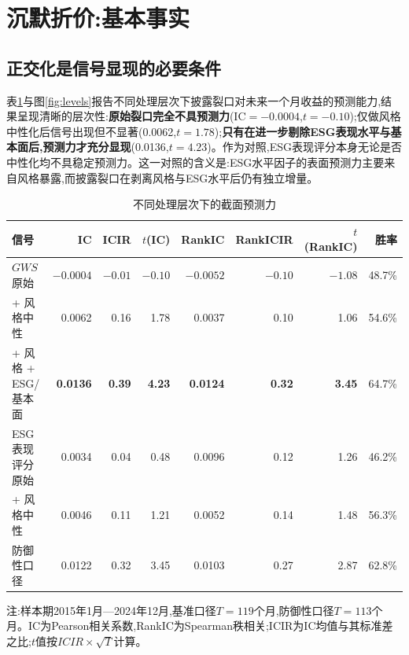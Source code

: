 \documentclass[UTF8, a4paper, fontset=fandol, zihao=-4]{ctexart}
\begin{document}
\section{沉默折价:基本事实}

\subsection{正交化是信号显现的必要条件}

表\ref{tab:ic}与图\ref{fig:levels}报告不同处理层次下披露裂口对未来一个月收益的预测能力,结果呈现清晰的层次性:\textbf{原始裂口完全不具预测力}(IC${}=-0.0004$,$t=-0.10$);仅做风格中性化后信号出现但不显著(0.0062,$t=1.78$);\textbf{只有在进一步剔除ESG表现水平与基本面后,预测力才充分显现}(0.0136,$t=4.23$)。作为对照,ESG表现评分本身无论是否中性化均不具稳定预测力。这一对照的含义是:ESG水平因子的表面预测力主要来自风格暴露,而披露裂口在剥离风格与ESG水平后仍有独立增量。

\begin{table}[H]
\centering
\begin{threeparttable}
\caption{不同处理层次下的截面预测力}\label{tab:ic}
\begin{tabular}{lrrrrrrr}
\toprule
信号 & IC & ICIR & $t$(IC) & RankIC & RankICIR & $t$(RankIC) & 胜率 \\
\midrule
$GWS$ 原始 & $-0.0004$ & $-0.01$ & $-0.10$ & $-0.0052$ & $-0.10$ & $-1.08$ & 48.7\% \\
\quad + 风格中性 & 0.0062 & 0.16 & 1.78 & 0.0037 & 0.10 & 1.06 & 54.6\% \\
\quad + 风格 + ESG/基本面 & \textbf{0.0136} & \textbf{0.39} & \textbf{4.23} & \textbf{0.0124} & \textbf{0.32} & \textbf{3.45} & 64.7\% \\
\midrule
ESG表现评分 原始 & 0.0034 & 0.04 & 0.48 & 0.0096 & 0.12 & 1.26 & 46.2\% \\
\quad + 风格中性 & 0.0046 & 0.11 & 1.21 & 0.0052 & 0.14 & 1.48 & 56.3\% \\
\midrule
防御性口径 & 0.0122 & 0.32 & 3.45 & 0.0103 & 0.27 & 2.87 & 62.8\% \\
\bottomrule
\end{tabular}
\begin{tablenotes}
\item 注:样本期2015年1月—2024年12月,基准口径$T=119$个月,防御性口径$T=113$个月。IC为Pearson相关系数,RankIC为Spearman秩相关;ICIR为IC均值与其标准差之比;$t$值按$ICIR\times\sqrt{T}$计算。
\end{tablenotes}
\end{threeparttable}
\end{table}
\end{document}
